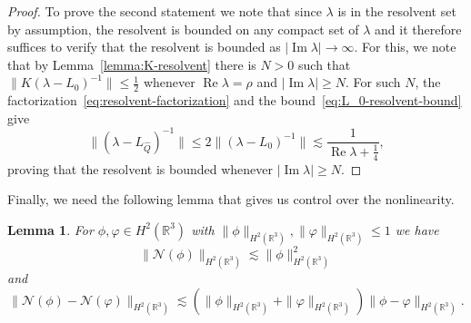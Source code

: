 \documentclass[11pt]{article}
\DeclareMathOperator{\real}{Re}
\DeclareMathOperator{\imag}{Im}
\newtheorem{lemma}[definition]{Lemma}
\begin{document}
\begin{proof}
  To prove the second statement we note that since \(\lambda\) is in
  the resolvent set by assumption, the resolvent is bounded on any
  compact set of \(\lambda\) and it therefore suffices to verify that
  the resolvent is bounded as \(|\imag \lambda| \to \infty\). For this, we
  note that by Lemma~\ref{lemma:K-resolvent} there is \(N > 0\) such
  that \(\|K(\lambda - L_{0})^{-1}\| \leq \frac{1}{2}\) whenever
  \(\real \lambda = \rho\) and \(|\imag \lambda| \geq N\). For such
  \(N\), the factorization~\eqref{eq:resolvent-factorization} and the
  bound~\eqref{eq:L_0-resolvent-bound} give
  \begin{equation*}
    \|(\lambda - L_{\hat{Q}})^{-1}\| \leq 2\|(\lambda - L_{0})^{-1}\| \lesssim \frac{1}{\real \lambda + \frac{1}{4}},
  \end{equation*}
  proving that the resolvent is bounded whenever
  \(|\imag \lambda| \geq N\).
\end{proof}

Finally, we need the following lemma that gives us control over the
nonlinearity.

\begin{lemma}\label{lemma:nonlinearity-bound}
  For \(\phi, \varphi \in H^{2}(\mathbb{R}^{3})\) with
  \(\|\phi\|_{H^{2}(\mathbb{R}^{3})},
  \|\varphi\|_{H^{2}(\mathbb{R}^{3})} \leq 1\) we have
  \begin{equation*}
    \|\mathcal{N}(\phi)\|_{H^{2}(\mathbb{R}^{3})} \lesssim \|\phi\|_{H^{2}(\mathbb{R}^{3})}^{2}
  \end{equation*}
  and
  \begin{equation*}
    \|\mathcal{N}(\phi) - \mathcal{N}(\varphi)\|_{H^{2}(\mathbb{R}^{3})}
    \lesssim (\|\phi\|_{H^{2}(\mathbb{R}^{3})} + \|\varphi\|_{H^{2}(\mathbb{R}^{3})})
    \|\phi - \varphi\|_{H^{2}(\mathbb{R}^{3})}.
  \end{equation*}
\end{lemma}
\end{document}
